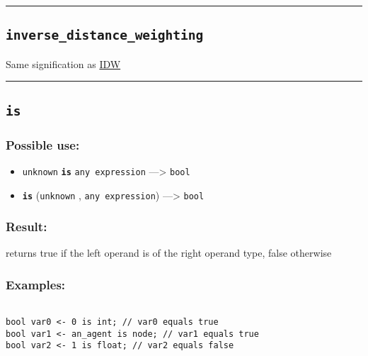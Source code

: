 \documentclass[]{book}
\providecommand{\tightlist}{%
  \setlength{\itemsep}{0pt}\setlength{\parskip}{0pt}}
\theoremstyle{definition}
\theoremstyle{definition}
\theoremstyle{definition}
\theoremstyle{remark}
\begin{document}
\begin{center}\rule{0.5\linewidth}{\linethickness}\end{center}

\subsection{\texorpdfstring{\texttt{inverse\_distance\_weighting}}{inverse\_distance\_weighting}}\label{inverse_distance_weighting}

Same signification as \href{OperatorsIM\#IDW}{IDW}

\begin{center}\rule{0.5\linewidth}{\linethickness}\end{center}

\subsection{\texorpdfstring{\texttt{is}}{is}}\label{is}

\subsubsection{Possible use:}\label{possible-use-284}

\begin{itemize}
\tightlist
\item
  \texttt{unknown} \textbf{\texttt{is}} \texttt{any\ expression}
  ---\textgreater{} \texttt{bool}
\item
  \textbf{\texttt{is}} (\texttt{unknown} , \texttt{any\ expression})
  ---\textgreater{} \texttt{bool}
\end{itemize}

\subsubsection{Result:}\label{result-274}

returns true if the left operand is of the right operand type, false
otherwise

\subsubsection{Examples:}\label{examples-214}

\begin{verbatim}
 
bool var0 <- 0 is int; // var0 equals true 
bool var1 <- an_agent is node; // var1 equals true 
bool var2 <- 1 is float; // var2 equals false
\end{verbatim}
\end{document}
